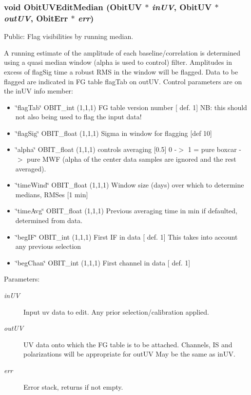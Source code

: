 \subsubsection{\setlength{\rightskip}{0pt plus 5cm}void Obit\-UVEdit\-Median ({\bf Obit\-UV} $\ast$ {\em in\-UV}, {\bf Obit\-UV} $\ast$ {\em out\-UV}, {\bf Obit\-Err} $\ast$ {\em err})}\label{ObitUVEdit_8c_a28}


Public: Flag visibilities by running median. 

A running estimate of the amplitude of each baseline/correlation is determined using a quasi median window (alpha is used to control) filter. Amplitudes in excess of flag\-Sig time a robust RMS in the window will be flagged. Data to be flagged are indicated in FG table flag\-Tab on out\-UV. Control parameters are on the in\-UV info member: \begin{itemize}
\item \char`\"{}flag\-Tab\char`\"{} OBIT\_\-int (1,1,1) FG table version number [ def. 1] NB: this should not also being used to flag the input data! \item \char`\"{}flag\-Sig\char`\"{} OBIT\_\-float (1,1,1) Sigma in window for flagging [def 10] \item \char`\"{}alpha\char`\"{} OBIT\_\-float (1,1,1) controls averaging [0.5] 0 -$>$ 1 = pure boxcar -$>$ pure MWF (alpha of the center data samples are ignored and the rest averaged). \item \char`\"{}time\-Wind\char`\"{} OBIT\_\-float (1,1,1) Window size (days) over which to determine medians, RMSes [1 min] \item \char`\"{}time\-Avg\char`\"{} OBIT\_\-float (1,1,1) Previous averaging time in min if defaulted, determined from data. \item \char`\"{}beg\-IF\char`\"{} OBIT\_\-int (1,1,1) First IF in data [ def. 1] This takes into account any previous selection \item \char`\"{}beg\-Chan\char`\"{} OBIT\_\-int (1,1,1) First channel in data [ def. 1]\end{itemize}
\begin{Desc}
\item[Parameters:]
\begin{description}
\item[{\em in\-UV}]Input uv data to edit. Any prior selection/calibration applied. \item[{\em out\-UV}]UV data onto which the FG table is to be attached. Channels, IS and polarizations will be appropriate for out\-UV May be the same as in\-UV. \item[{\em err}]Error stack, returns if not empty. \end{description}
\end{Desc}
